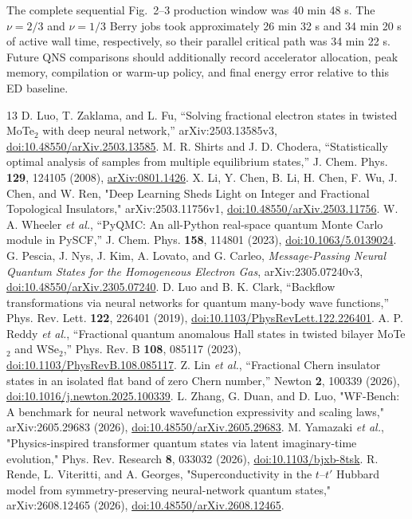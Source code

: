 \documentclass[10pt,twocolumn]{article}
\begin{document}
The complete sequential Fig.~2--3 production window was 40 min 48 s.  The
$\nu=2/3$ and $\nu=1/3$ Berry jobs took approximately 26 min 32 s and
34 min 20 s of active wall time, respectively, so their parallel critical path
was 34 min 22 s.  Future QNS comparisons should additionally record accelerator
allocation, peak memory, compilation or warm-up policy, and final energy error
relative to this ED baseline.


\begin{thebibliography}{13}
 D. Luo, T. Zaklama, and L. Fu, ``Solving fractional electron states in twisted MoTe$_2$ with deep neural network,'' arXiv:2503.13585v3, \href{https://doi.org/10.48550/arXiv.2503.13585}{doi:10.48550/arXiv.2503.13585}.
 M. R. Shirts and J. D. Chodera, ``Statistically optimal analysis of samples from multiple equilibrium states,'' J. Chem. Phys. \textbf{129}, 124105 (2008), \href{https://arxiv.org/abs/0801.1426}{arXiv:0801.1426}.
 X. Li, Y. Chen, B. Li, H. Chen, F. Wu, J. Chen, and W. Ren,
"Deep Learning Sheds Light on Integer and Fractional Topological Insulators,"
arXiv:2503.11756v1,
\href{https://doi.org/10.48550/arXiv.2503.11756}{doi:10.48550/arXiv.2503.11756}.
 W. A. Wheeler \emph{et al.}, ``PyQMC: An all-Python real-space
quantum Monte Carlo module in PySCF,'' J. Chem. Phys. \textbf{158}, 114801
(2023), \href{https://doi.org/10.1063/5.0139024}{doi:10.1063/5.0139024}.
 G. Pescia, J. Nys, J. Kim, A. Lovato, and G. Carleo, \emph{Message-Passing Neural Quantum States for the Homogeneous Electron Gas}, arXiv:2305.07240v3, \href{https://doi.org/10.48550/arXiv.2305.07240}{doi:10.48550/arXiv.2305.07240}.
 D. Luo and B. K. Clark, ``Backflow transformations via neural networks for quantum many-body wave functions,'' Phys. Rev. Lett. \textbf{122}, 226401 (2019), \href{https://doi.org/10.1103/PhysRevLett.122.226401}{doi:10.1103/PhysRevLett.122.226401}.
 A. P. Reddy \emph{et al.}, ``Fractional quantum anomalous Hall states in twisted bilayer MoTe$_2$ and WSe$_2$,'' Phys. Rev. B \textbf{108}, 085117 (2023), \href{https://doi.org/10.1103/PhysRevB.108.085117}{doi:10.1103/PhysRevB.108.085117}.
 Z. Lin \emph{et al.}, ``Fractional Chern insulator states in an isolated flat band of zero Chern number,'' Newton \textbf{2}, 100339 (2026), \href{https://doi.org/10.1016/j.newton.2025.100339}{doi:10.1016/j.newton.2025.100339}.
 L. Zhang, G. Duan, and D. Luo, "WF-Bench: A benchmark for neural network wavefunction expressivity and scaling laws," arXiv:2605.29683 (2026), \href{https://doi.org/10.48550/arXiv.2605.29683}{doi:10.48550/arXiv.2605.29683}.
 M. Yamazaki \emph{et al.}, "Physics-inspired transformer quantum states via latent imaginary-time evolution," Phys. Rev. Research \textbf{8}, 033032 (2026), \href{https://doi.org/10.1103/bjxb-8tsk}{doi:10.1103/bjxb-8tsk}.
 R. Rende, L. Viteritti, and A. Georges, "Superconductivity in the $t$--$t'$ Hubbard model from symmetry-preserving neural-network quantum states," arXiv:2608.12465 (2026), \href{https://doi.org/10.48550/arXiv.2608.12465}{doi:10.48550/arXiv.2608.12465}.
\end{thebibliography}


\end{document}
